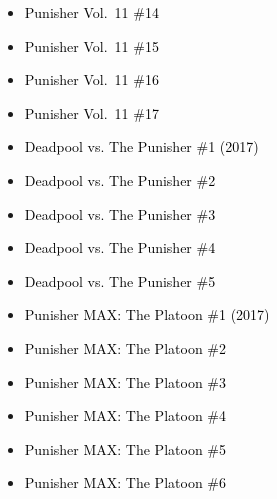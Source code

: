 \documentclass[12pt]{article}
\newcommand{\checkbox}{\raisebox{0.0ex}{\fbox{\rule{0ex}{1.5ex} \rule{1.5ex}{0ex}}}}
\begin{document}
\vspace{0.3cm}
\noindent
\begin{tcolorbox}[
  colback=white!95!gray,
  colframe=black,
  width=\textwidth,
  arc=4mm,
  auto outer arc,
  boxrule=0.8pt,
  left=8pt,right=8pt,top=8pt,bottom=8pt
]
\begin{itemize}[left=0pt,label={\checkbox}]
    \item \textcolor{black}{Punisher Vol.\ 11 \#14}
    \item \textcolor{black}{Punisher Vol.\ 11 \#15}
    \item \textcolor{black}{Punisher Vol.\ 11 \#16}
    \item \textcolor{black}{Punisher Vol.\ 11 \#17}
    \item \textcolor{black}{Deadpool vs. The Punisher \#1 (2017)}
    \item \textcolor{black}{Deadpool vs. The Punisher \#2}
    \item \textcolor{black}{Deadpool vs. The Punisher \#3}
    \item \textcolor{black}{Deadpool vs. The Punisher \#4}
    \item \textcolor{black}{Deadpool vs. The Punisher \#5}
    \item \textcolor{black}{Punisher MAX: The Platoon \#1 (2017)}
    \item \textcolor{black}{Punisher MAX: The Platoon \#2}
    \item \textcolor{black}{Punisher MAX: The Platoon \#3}
    \item \textcolor{black}{Punisher MAX: The Platoon \#4}
    \item \textcolor{black}{Punisher MAX: The Platoon \#5}
    \item \textcolor{black}{Punisher MAX: The Platoon \#6}
\end{itemize}
\end{tcolorbox}

\newpage
{}
\end{document}
